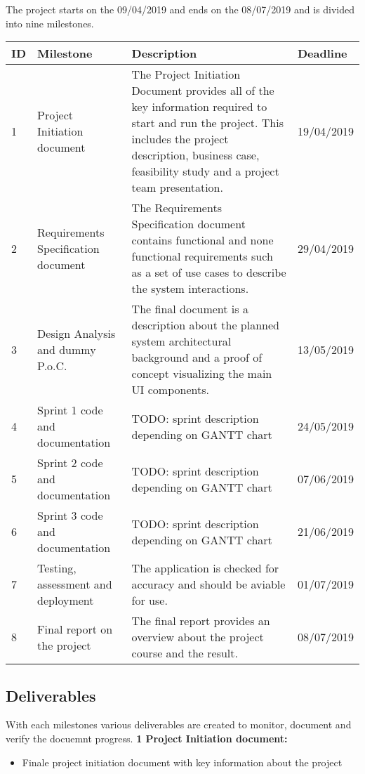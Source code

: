 \documentclass[notitlepage]{article}
\begin{document}
\begin{flushleft}
The project starts on the 09/04/2019 and ends on the 08/07/2019 and is divided into nine milestones.  
\begin{center}
  \begin{tabular}{ m{0.4cm} m{5cm} m{8.5cm} m{2cm} }
  	\hline
		ID & Milestone & Description & Deadline \\ \hline
		1 & Project Initiation document & The Project Initiation Document provides all of the key information required to start and run the project. This includes the project description, business case, feasibility study and a project team presentation.  & 19/04/2019 \\ \hline
		2 & Requirements Specification document & The Requirements Specification document contains functional and none functional requirements such as a set of use cases to describe the system interactions. & 29/04/2019 \\ \hline
		3 & Design Analysis and dummy P.o.C. & The final document is a description about the planned system architectural background and a proof of concept visualizing the main UI components. & 13/05/2019 \\ \hline
		4 & Sprint 1 code and documentation & {\color{red} TODO: sprint description depending on GANTT chart}  & 24/05/2019 \\ \hline
		5 & Sprint 2 code and documentation & {\color{red} TODO: sprint description depending on GANTT chart} & 07/06/2019 \\ \hline
		6 & Sprint 3 code and documentation & {\color{red} TODO: sprint description depending on GANTT chart} & 21/06/2019 \\ \hline
		7 & Testing, assessment and deployment & The application is checked for accuracy and should be aviable for use. & 01/07/2019 \\ \hline
		8 & Final report on the project & The final report provides an overview about the project course and the result. & 08/07/2019 \\ \hline
	\end{tabular}
\end{center}

 

\subsection{Deliverables}
With each milestones various deliverables are created to monitor, document and verify the docuemnt progress.
\newline
\textbf{1 Project Initiation document:}
\\
\begin{itemize}
	\item Finale project initiation document with key information about the project
\end{itemize}


\end{flushleft}
\end{document}
